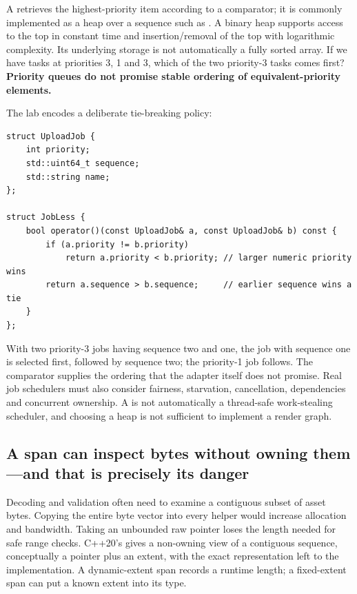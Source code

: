 A  retrieves the highest-priority item according to a comparator; it is commonly implemented as a heap over a sequence such as . A binary heap supports access to the top in constant time and insertion/removal of the top with logarithmic complexity. Its underlying storage is not automatically a fully sorted array. If we have tasks at priorities 3, 1 and 3, which of the two priority-3 tasks comes first? \textbf{Priority queues do not promise stable ordering of equivalent-priority elements.}

The lab encodes a deliberate tie-breaking policy:

\begin{verbatim}
struct UploadJob {
    int priority;
    std::uint64_t sequence;
    std::string name;
};

struct JobLess {
    bool operator()(const UploadJob& a, const UploadJob& b) const {
        if (a.priority != b.priority)
            return a.priority < b.priority; // larger numeric priority wins
        return a.sequence > b.sequence;     // earlier sequence wins a tie
    }
};
\end{verbatim}

With two priority-3 jobs having sequence two and one, the job with sequence one is selected first, followed by sequence two; the priority-1 job follows. The comparator supplies the ordering that the adapter itself does not promise. Real job schedulers must also consider fairness, starvation, cancellation, dependencies and concurrent ownership. A  is not automatically a thread-safe work-stealing scheduler, and choosing a heap is not sufficient to implement a render graph.

\subsection{A span can inspect bytes without owning them---and that is precisely its danger}\label{05-engine-i-ch005-a-span-can-inspect-bytes-without-owning-themand-that-is-precisely-its-danger}

\hypertarget{05-engine-i-ch005-a-span-can-inspect-bytes-without-owning-themand-that-is-precisely-its-danger}{}

Decoding and validation often need to examine a contiguous subset of asset bytes. Copying the entire byte vector into every helper would increase allocation and bandwidth. Taking an unbounded raw pointer loses the length needed for safe range checks. C++20's  gives a non-owning view of a contiguous sequence, conceptually a pointer plus an extent, with the exact representation left to the implementation. A dynamic-extent span records a runtime length; a fixed-extent span can put a known extent into its type.

